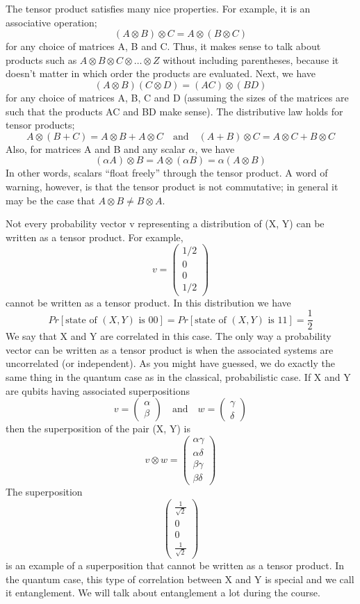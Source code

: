 The tensor product satisfies many nice properties. For example, it is an associative operation;
$$(A \otimes B) \otimes  C = A \otimes (B \otimes C)$$ for any choice of matrices A, B and C. Thus, it makes sense to talk about products such as $A \otimes B \otimes C \otimes \ldots \otimes Z$ without including parentheses, because it doesn’t matter in which order the products are evaluated. Next, we have
\[
(A\otimes B)(C\otimes D)=(AC)\otimes (BD)
\]
for any choice of matrices A, B, C and D (assuming the sizes of the matrices are such that the
products AC and BD make sense). The distributive law holds for tensor products;
\[
A\otimes (B+C)=A\otimes B+A\otimes C \quad \text{and} \quad (A+B)\otimes C=A\otimes C+B\otimes C
\]
Also, for matrices A and B and any scalar $\alpha$, we have
\[
(\alpha A)\otimes B=A \otimes (\alpha B)=\alpha(A\otimes B)
\]
In other words, scalars “float freely” through the tensor product. A word of warning, however, is
that the tensor product is not commutative; in general it may be the case that $A\otimes B\neq B\otimes A$.

Not every probability vector v representing a distribution of (X, Y) can be written as a tensor
product. For example,
\[
v=\begin{pmatrix}1/2\\0\\0 \\ 1/2 \end{pmatrix}
\]
cannot be written as a tensor product. In this distribution we have
\[
Pr[\text{state of $(X,Y)$ is $00$}]=Pr[\text{state of $(X,Y)$ is }11]=\frac{1}{2}
\]
We say that X and Y are correlated in this case. The only way a probability vector can be written
as a tensor product is when the associated systems are uncorrelated (or independent).
As you might have guessed, we do exactly the same thing in the quantum case as in the classical, probabilistic case. If X and Y are qubits having associated superpositions
\[
v=\begin{pmatrix} \alpha \\ \beta \end{pmatrix} \quad \text{and} \quad w=\begin{pmatrix} \gamma \\ \delta \end{pmatrix}
\]
then the superposition of the pair (X, Y) is
\[
v\otimes w=\begin{pmatrix} \alpha\gamma \\ \alpha\delta \\ \beta\gamma\\\beta\delta \end{pmatrix}
\]
The superposition
\[
\begin{pmatrix} \frac{1}{\sqrt{2}} \\ 0 \\ 0 \\ \frac{1}{\sqrt{2}} \end{pmatrix}
\]
is an example of a superposition that cannot be written as a tensor product. In the quantum case,
this type of correlation between X and Y is special and we call it entanglement. We will talk about
entanglement a lot during the course.

